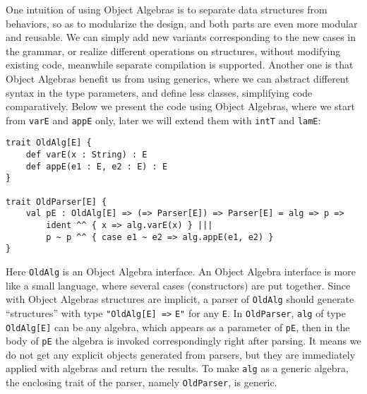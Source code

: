 One intuition of using Object Algebras is to separate data structures from behaviors, so as to modularize the design, and both parts are even more modular and reusable. We can simply add new variants corresponding to the new cases in the grammar, or realize different operations on structures, without modifying existing code, meanwhile separate compilation is supported. Another one is that Object Algebras benefit us from using generics, where we can abstract different syntax in the type parameters, and define less classes, simplifying code comparatively. Below we present the code using Object Algebras, where we start from \lstinline{varE} and \lstinline{appE} only, later we will extend them with \lstinline{intT} and \lstinline{lamE}:
\begin{lstlisting}
trait OldAlg[E] {
    def varE(x : String) : E
    def appE(e1 : E, e2 : E) : E
}

trait OldParser[E] {
    val pE : OldAlg[E] => (=> Parser[E]) => Parser[E] = alg => p =>
        ident ^^ { x => alg.varE(x) } |||
        p ~ p ^^ { case e1 ~ e2 => alg.appE(e1, e2) }
}
\end{lstlisting}
Here \lstinline{OldAlg} is an Object Algebra interface. An Object Algebra interface is more like a small language, where several cases (constructors) are put together. Since with Object Algebras structures are implicit, a parser of \lstinline{OldAlg} should generate ``structures'' with
type \lstinline{"OldAlg[E] =>} \lstinline{E"} for any \lstinline{E}. In \lstinline{OldParser}, \lstinline{alg} of type
\lstinline{OldAlg[E]} can be any algebra, which appears as a parameter of \lstinline{pE}, then in the body of \lstinline{pE} the algebra
is invoked correspondingly right after parsing. It means we do not get any explicit objects generated from parsers, but they are immediately applied with algebras and return the results. To make \lstinline{alg} as a generic algebra, the enclosing trait of the parser, namely \lstinline{OldParser}, is generic.

